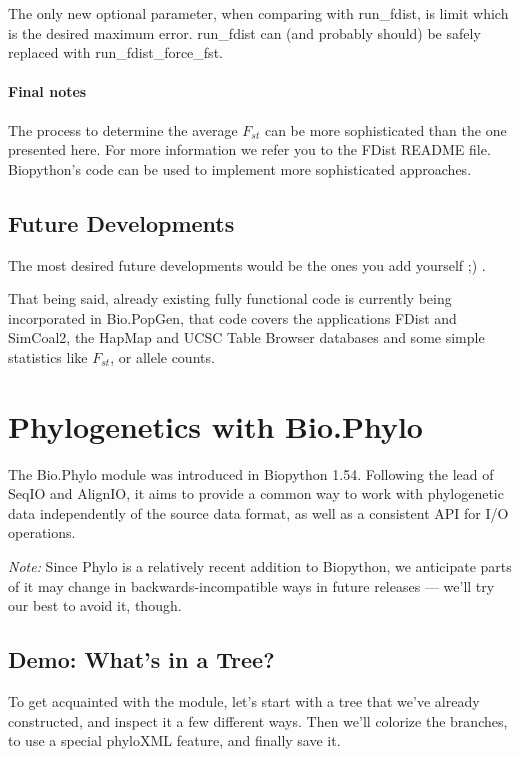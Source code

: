 \documentclass{report}
\begin{document}
The only new optional parameter, when comparing with run\_fdist, is limit
which is the desired maximum error. run\_fdist can (and probably should)
be safely replaced with run\_fdist\_force\_fst.

\subsubsection{Final notes}

The process to determine the average $F_{st}$ can be more sophisticated than
the one presented here. For more information we refer you to the FDist
README file. Biopython's code can be used to implement more sophisticated
approaches.

\section{Future Developments}

The most desired future developments would be the ones you add yourself ;) .

That being said, already existing fully functional code is currently being
incorporated in Bio.PopGen, that code covers the applications FDist and
SimCoal2, the HapMap and UCSC Table Browser databases and some simple statistics
like $F_{st}$, or allele counts.

\chapter{Phylogenetics with Bio.Phylo}
\label{sec:Phylo}

The Bio.Phylo module was introduced in Biopython 1.54. Following the lead of SeqIO and AlignIO,
it aims to provide a common way to work with phylogenetic data independently of the source data
format, as well as a consistent API for I/O operations.

{\em Note:} Since Phylo is a relatively recent addition to Biopython, we anticipate parts of it
may change in backwards-incompatible ways in future releases --- we'll try our best to avoid
it, though.

\section{Demo: What's in a Tree?}

To get acquainted with the module, let's start with a tree that we've already constructed, and
inspect it a few different ways.  Then we'll colorize the branches, to use a special phyloXML
feature, and finally save it.
\end{document}
